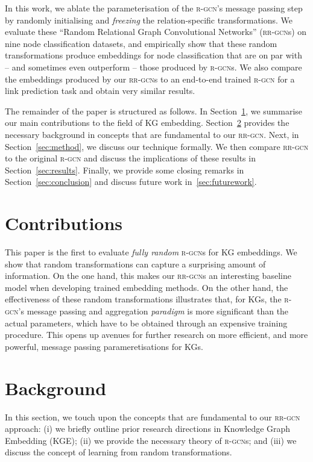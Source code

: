 \documentclass{llncs}
\begin{document}
In this work, we ablate the parameterisation of the \textsc{r-gcn}'s message passing step by randomly initialising and \textit{freezing} the relation-specific transformations.
We evaluate these ``Random Relational Graph Convolutional Networks'' (\textsc{rr\mbox{-}gcn}s) on nine node classification datasets, and empirically show that these random transformations produce embeddings for node classification that are on par with -- and sometimes even outperform -- those produced by \textsc{r-gcn}s. We also compare the embeddings produced by our \textsc{rr-gcn}s to an end-to-end trained \textsc{r-gcn} for a link prediction task and obtain very similar results. 

The remainder of the paper is structured as follows. In Section~\ref{sec:contributions}, we summarise our main contributions to the field of KG embedding. Section~\ref{sec:background} provides the necessary background in concepts that are fundamental to our \textsc{rr-gcn}. Next, in Section~\ref{sec:method}, we discuss our technique formally. We then compare \textsc{rr-gcn} to the original \textsc{r-gcn} and discuss the implications of these results in Section~\ref{sec:results}. Finally, we provide some closing remarks in Section~\ref{sec:conclusion} and discuss future work in~\ref{sec:futurework}.

\section{Contributions}
\label{sec:contributions}
This paper is the first to evaluate \emph{fully random} \textsc{r-gcn}s for KG embeddings. We show that random transformations can capture a surprising amount of information. On the one hand, this makes our \textsc{rr-gcn}s an interesting baseline model when developing trained embedding methods. On the other hand, the effectiveness of these random transformations illustrates that, for KGs, the \textsc{r-gcn}'s message passing and aggregation \textit{paradigm} is more significant than the actual parameters, which have to be obtained through an expensive training procedure. This opens up avenues for further research on more efficient, and more powerful, message passing parameretisations for KGs. 

\section{Background} \label{sec:background}
In this section, we touch upon the concepts that are fundamental to our \textsc{rr-gcn} approach: (i) we briefly outline prior research directions in Knowledge Graph Embedding (KGE); (ii) we provide the necessary theory of \textsc{r-gcn}s; and (iii) we discuss the concept of learning from random transformations.
\end{document}
